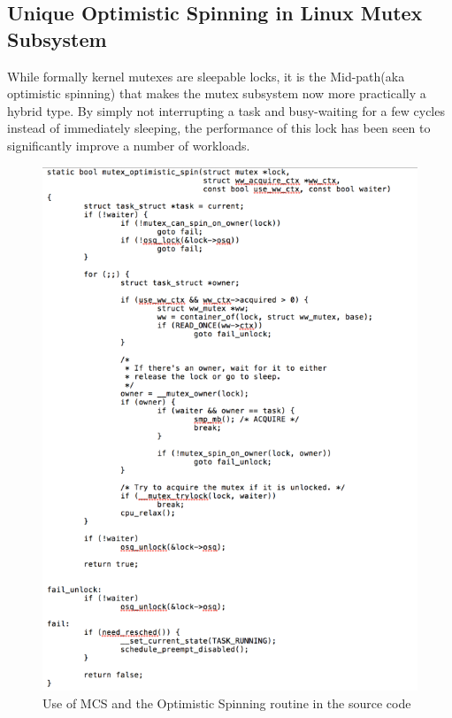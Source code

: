 \documentclass[10pt,preprint]{sigplanconf}
\begin{document}
\subsection{Unique Optimistic Spinning in Linux Mutex Subsystem}
While formally kernel mutexes are sleepable locks, it is the Mid-path(aka optimistic spinning) that makes the mutex subsystem now more practically a hybrid type. By simply not interrupting a task and busy-waiting for a few cycles instead of immediately sleeping, the performance of this lock has been seen to significantly improve a number of workloads. \\

\begin{figure}[h!]
	\includegraphics[scale=1]{image02.png}
	\caption{Use of MCS and the Optimistic Spinning routine in the source code}
\end{figure}

\newpage
\end{document}
